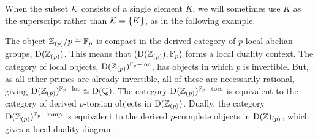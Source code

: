 \begin{remark}
    When the subset $\mathcal{K}$ consists of a single element $K$, we will sometimes use $K$ as the superscript rather than $\mathcal{K} = \{K\}$, as in the following example.   
\end{remark}

\begin{example}
    The object $\mathbb{Z}_{(p)}/p \cong \mathbb{F}_p$ is compact in the derived category of $p$-local abelian groups, $\mathrm{D}(\mathbb{Z}_{(p)})$. This means that $(\mathrm{D}(\mathbb{Z}_{(p)}), \mathbb{F}_p)$ forms a local duality context. The category of local objects, $\mathrm{D}(\mathbb{Z}_{(p)})^{\mathbb{F}_p-\mathrm{loc}}$, has objects in which $p$ is invertible. But, as all other primes are already invertible, all of these are necessarily rational, giving $\mathrm{D}(\mathbb{Z}_{(p)})^{\mathbb{F}_p-\mathrm{loc}} \simeq \mathrm{D}(\mathbb{Q})$. The category $\mathrm{D}(\mathbb{Z}_{(p)})^{\mathbb{F}_p-\mathrm{tors}}$ is equivalent to the category of derived $p$-torsion objects in $\mathrm{D}(\mathbb{Z}_{(p)})$. Dually, the category $\mathrm{D}(\mathbb{Z}_{(p)})^{\mathbb{F}_p-\mathrm{comp}}$ is equivalent to the derived $p$-complete objects in $\mathrm{D}(\mathbb{Z})_{(p)}$, which gives a local duality diagram 
    \begin{center}
    \end{center}
\end{example}











